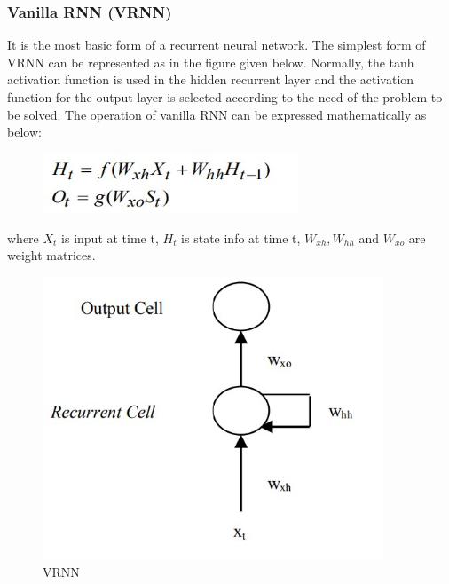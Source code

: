\subsubsection{Vanilla RNN (VRNN)}
It is the most basic form of a recurrent neural network. The simplest form of VRNN can be represented as in the figure given below. Normally, the tanh activation function is used in the hidden recurrent layer and the activation function for the output layer is selected according to the need of the problem to be solved. The operation of vanilla RNN can be expressed mathematically as below:\par
\begin{figure}[tbh] %
\begin{center}
	\includegraphics[width=3in]{images/vform.jpg} 
\end{center}
\end{figure}
where $X_t$ is input at time t, $H_t$ is state info at time t, $W_{xh},W_{hh}$ and $W_{xo}$ are weight matrices.
\begin{figure}[tbh] %
\begin{center}
	\includegraphics[width=4in]{images/vrnn.jpg} 
	\caption{VRNN} %
	\label{VRNN} %
\end{center}
\end{figure}
